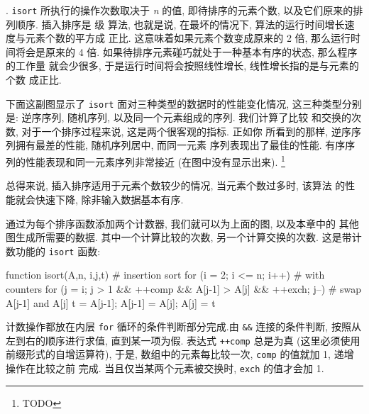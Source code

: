 . \texttt{isort} 所执行的操作次数取决于 \textit{n} 的值,
即待排序的元素个数, 以及它们原来的排列顺序. 插入排序是  级
算法, 也就是说, 在最坏的情况下, 算法的运行时间增长速度与元素个数的平方成
正比. 这意味着如果元素个数变成原来的 2 倍, 那么运行时间将会是原来的
4 倍. 如果待排序元素碰巧就处于一种基本有序的状态, 那么程序的工作量
就会少很多, 于是运行时间将会按照线性增长, 线性增长指的是与元素的个数
成正比.

下面这副图显示了 \texttt{isort} 面对三种类型的数据时的性能变化情况, 
这三种类型分别是: 逆序序列, 随机序列, 以及同一个元素组成的序列. 
我们计算了比较
和交换的次数, 对于一个排序过程来说, 这是两个很客观的指标. 正如你
所看到的那样, 逆序序列拥有最差的性能, 随机序列居中, 而同一元素
序列表现出了最佳的性能. 有序序列的性能表现和同一元素序列非常接近
(在图中没有显示出来). \footnote{TODO}

总得来说, 插入排序适用于元素个数较少的情况, 当元素个数过多时, 该算法
的性能就会快速下降, 除非输入数据基本有序.

通过为每个排序函数添加两个计数器, 我们就可以为上面的图, 以及本章中的
其他图生成所需要的数据. 其中一个计算比较的次数, 另一个计算交换的次数.
这是带计数功能的 \texttt{isort} 函数:
\begin{awkcode}
    function isort(A,n,     i,j,t) {  # insertion sort
        for (i = 2; i <= n; i++)      # with counters
            for (j = i; j > 1 && ++comp &&
              A[j-1] > A[j] && ++exch; j--) {
                # swap A[j-1] and A[j]
                t = A[j-1]; A[j-1] = A[j]; A[j] = t
            }
    }
\end{awkcode}
计数操作都放在内层 \texttt{for} 循环的条件判断部分完成.由 \verb'&&' 
连接的条件判断, 按照从左到右的顺序进行求值, 直到某一项为假. 表达式
\texttt{++comp} 总是为真 (这里必须使用前缀形式的自增运算符), 于是,
数组中的元素每比较一次, \texttt{comp} 的值就加 1, 递增操作在比较之前
完成. 当且仅当某两个元素被交换时, \texttt{exch} 的值才会加 1.

